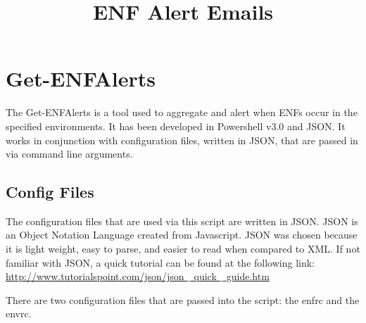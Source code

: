 \documentclass[a4paper,12pt]{report}
\title{ENF Alert Emails}
\begin{document}
\maketitle
\sloppy 
 \par





\tableofcontents
{}
\listoffigures
{}
\listoftables
{}

\begin{flushleft}



\newpage

\end{flushleft}\vspace{14pt}
\section*{Get-ENFAlerts}
 \par
The Get-ENFAlerts is a tool used to aggregate and alert when ENFs occur in the specified environments. It has been developed in Powershell v3.0 and JSON. It works in conjunction with configuration files, written in JSON, that are passed in via command line arguments.  \par
\subsection*{Config Files}
 \par
The configuration files that are used via this script are written in JSON. JSON is an Object Notation Language created from Javascript. JSON was chosen because it is light weight, easy to parse, and easier to read when compared to XML. If not familiar with JSON, a quick tutorial can be found at the following link: \href{http://www.tutorialspoint.com/json/json $  \_  $ quick $  \_  $ guide.htm}{http://www.tutorialspoint.com/json/json $  \_  $ quick $  \_  $ guide.htm}
 \par
There are two configuration files that are passed into the script: the enfrc and the envrc.  \par
\end{document}

